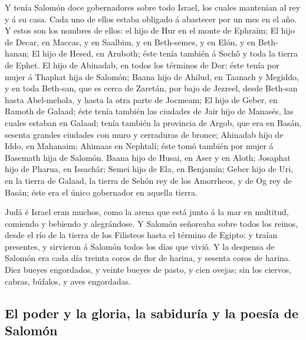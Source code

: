  Y tenía Salomón doce gobernadores sobre todo Israel, los
cuales mantenían al rey y á su casa. Cada uno de ellos estaba obligado á
abastecer por un mes en el año.  Y estos son los nombres
de ellos: el hijo de Hur en el monte de Ephraim;  El hijo
de Decar, en Maccas, y en Saalbim, y en Beth-semes, y en Elón, y en
Beth-hanan;  El hijo de Hesed, en Aruboth; éste tenía
también á Sochô y toda la tierra de Ephet.  El hijo de
Abinadab, en todos los términos de Dor: éste tenía por mujer á Thaphat
hija de Salomón;  Baana hijo de Ahilud, en Taanach y
Megiddo, y en toda Beth-san, que es cerca de Zaretán, por bajo de
Jezreel, desde Beth-san hasta Abel-mehola, y hasta la otra parte de
Jocmeam;  El hijo de Geber, en Ramoth de Galaad; éste
tenía también las ciudades de Jair hijo de Manasés, las cuales estaban
en Galaad; tenía también la provincia de Argob, que era en Basán,
sesenta grandes ciudades con muro y cerraduras de bronce;
 Ahinadab hijo de Iddo, en Mahanaim; 
Ahimaas en Nephtalí; éste tomó también por mujer á Basemath hija de
Salomón.  Baana hijo de Husai, en Aser y en Aloth;
 Josaphat hijo de Pharua, en Issachâr; 
Semei hijo de Ela, en Benjamín;  Geber hijo de Uri, en la
tierra de Galaad, la tierra de Sehón rey de los Amorrheos, y de Og rey
de Basán; éste era el único gobernador en aquella tierra.

 Judá é Israel eran muchos, como la arena que está junto
á la mar en multitud, comiendo y bebiendo y alegrándose. 
Y Salomón señoreaba sobre todos los reinos, desde el río de la tierra de
los Filisteos hasta el término de Egipto: y traían presentes, y
sirvieron á Salomón todos los días que vivió.  Y la
despensa de Salomón era cada día treinta coros de flor de harina, y
sesenta coros de harina.  Diez bueyes engordados, y
veinte bueyes de pasto, y cien ovejas; sin los ciervos, cabras, búfalos,
y aves engordadas.

\hypertarget{el-poder-y-la-gloria-la-sabiduruxeda-y-la-poesuxeda-de-salomuxf3n}{%
\subsection{El poder y la gloria, la sabiduría y la poesía de
Salomón}\label{el-poder-y-la-gloria-la-sabiduruxeda-y-la-poesuxeda-de-salomuxf3n}}

